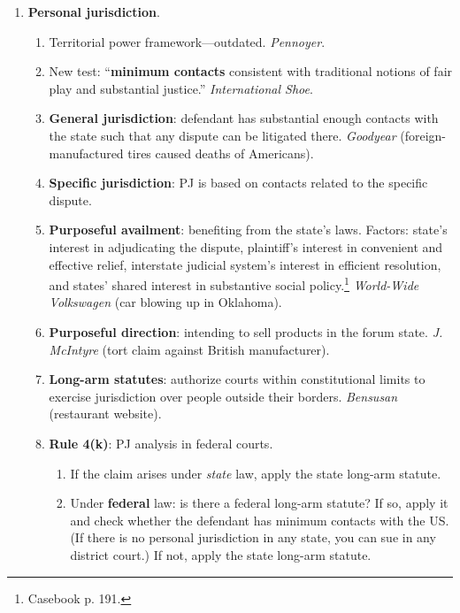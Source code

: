 \begin{enumerate}
    \item \textbf{Personal jurisdiction}.
    \begin{enumerate}
        \item Territorial power framework---outdated. \emph{Pennoyer}.
        \item New test: ``\textbf{minimum contacts} consistent with 
        traditional notions of fair play and substantial justice.'' 
        \emph{International Shoe}.
        \item \textbf{General jurisdiction}: defendant has substantial enough 
        contacts with the state such that any dispute can be litigated there.  
        \emph{Goodyear} (foreign-manufactured tires caused deaths of 
        Americans).
        \item \textbf{Specific jurisdiction}: PJ is based on contacts related 
        to the specific dispute.
        \item \textbf{Purposeful availment}: benefiting from the state's laws.  
        Factors: state's interest in adjudicating the dispute, plaintiff's 
        interest in convenient and effective relief, interstate judicial 
        system's interest in efficient resolution, and states' shared interest 
        in substantive social policy.\footnote{Casebook p. 191.}
        \emph{World-Wide Volkswagen} (car blowing up in Oklahoma).
        \item \textbf{Purposeful direction}: intending to sell products in the 
        forum state. \emph{J. McIntyre} (tort claim against British 
        manufacturer).
        \item \textbf{Long-arm statutes}: authorize courts within 
        constitutional limits to exercise jurisdiction over people outside 
        their borders. \emph{Bensusan} (restaurant website).
        \item \textbf{Rule 4(k)}: PJ analysis in federal courts.  
        \begin{enumerate}
            \item If the claim arises under \emph{state} law, apply the state 
            long-arm statute.
            \item Under \textbf{federal} law: is there a federal long-arm 
            statute? If so, apply it and check whether the defendant has 
            minimum contacts with the US.  (If there is no personal 
            jurisdiction in any state, you can sue in any district court.) If 
            not, apply the state long-arm statute.  \end{enumerate}

\end{enumerate}
\end{enumerate}
